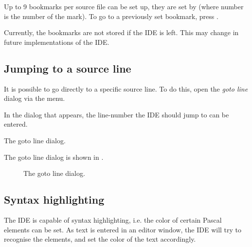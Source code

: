 Up to 9 bookmarks per source file can be set up, they are set by
 (where number is the number of the mark).
To go to a previously set bookmark, press .

\begin{remark}
Currently, the bookmarks are not stored if the IDE is left. This may
change in future implementations of the IDE.
\end{remark}

%
%
\subsection{Jumping to a source line}
It is possible to go directly to a specific source line. To do this, open
the {\em goto line} dialog via the  menu.

In the dialog that appears, the line-number the IDE should jump to can be
entered.
\begin{htmlonly}
The goto line dialog.
\end{htmlonly}
\begin{latexonly}
The goto line dialog is shown in .
\begin{figure}[ht]
\begin{center}
\caption{The goto line dialog.}\label{fig:gotoline}
\ifpdf
{}
\else
{}
\fi
\end{center}
\end{figure}
\end{latexonly}


%
%
\subsection{Syntax highlighting}
\label{se:syntaxhighlighting}
The IDE is capable of syntax highlighting, i.e. the color of certain 
Pascal elements can be set. As text is entered in an editor window, 
the IDE will try to recognise the elements, and set the color of the
text accordingly.


